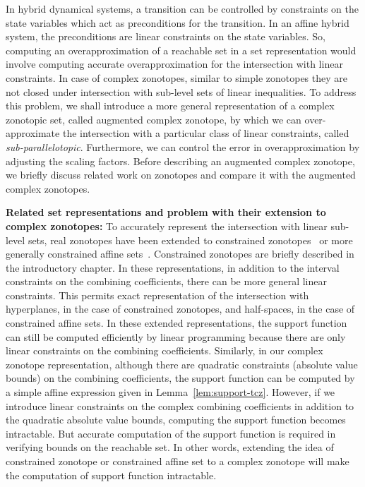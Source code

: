 In hybrid dynamical systems, a transition can be controlled by
constraints on the state variables which act as preconditions for the
transition.  In an affine hybrid system, the preconditions are linear
constraints on the state variables.  So, computing an
overapproximation of a reachable set in a set representation would
involve computing accurate overapproximation for the intersection with
linear constraints.  In case of complex zonotopes, similar to simple
zonotopes they are not closed under intersection with sub-level sets
of linear inequalities.  To address this problem, we shall introduce a
more general representation of a complex zonotopic set, called
augmented complex zonotope, by which we can over-approximate the
intersection with a particular class of linear constraints, called
\emph{sub-parallelotopic}.  Furthermore, we can control the error in
overapproximation by adjusting the scaling factors.  Before describing
an augmented complex zonotope, we briefly discuss related work on
zonotopes and compare it with the augmented complex zonotopes.  

{\bf Related set representations and problem with their extension to complex
zonotopes: } To accurately represent the intersection with linear
sub-level sets, real zonotopes have been extended to constrained
zonotopes~\cite{scott2016constrained} or more generally constrained
affine sets~\cite{Ghorbal2010}.  Constrained zonotopes are briefly
described in the introductory chapter.  In these representations, in
addition to the interval constraints on the combining coefficients,
there can be more general linear constraints.  This permits exact
representation of the intersection with hyperplanes, in the case of
constrained zonotopes, and half-spaces, in the case of constrained
affine sets.  In these extended representations, the support function
can still be computed efficiently by linear programming because there are
only linear constraints on the combining coefficients.  Similarly, in
our complex zonotope representation, although there are quadratic
constraints (absolute value bounds) on the combining coefficients, the
support function can be computed by a simple affine expression given
in Lemma~\ref{lem:support-tcz}.  However, if we introduce linear
constraints on the complex combining coefficients in addition to the
quadratic absolute value bounds, computing the support function
becomes intractable.  But accurate computation of the support function
is required in verifying bounds on the reachable set.  In other words,
extending the idea of constrained zonotope or constrained affine set
to a complex zonotope will make the computation of support function
intractable.

